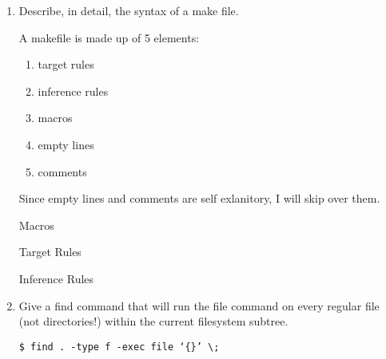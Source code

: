 \documentclass[letterpaper,10pt]{article}
\begin{document}
\begin{enumerate}
\item Describe, in detail, the syntax of a make file.

A makefile is made up of 5 elements:
    \begin{enumerate}
        \item target rules
        \item inference rules
        \item macros
        \item empty lines
        \item comments
    \end{enumerate}

Since empty lines and comments are self exlanitory, I will skip over
them.

Macros

Target Rules

Inference Rules


\item Give a find command that will run the file command on every regular file (not directories!) within the current filesystem subtree.

\texttt{\$ find . -type f -exec file `\{\}' \textbackslash;}

\end{enumerate}
\end{document}
